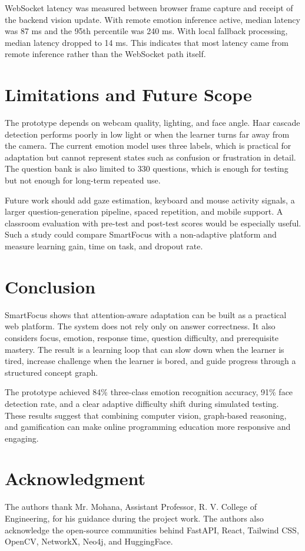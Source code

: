 \documentclass[conference]{IEEEtran}
\begin{document}
WebSocket latency was measured between browser frame capture and receipt of the backend vision update. With remote emotion inference active, median latency was 87 ms and the 95th percentile was 240 ms. With local fallback processing, median latency dropped to 14 ms. This indicates that most latency came from remote inference rather than the WebSocket path itself.

\FloatBarrier

\section{Limitations and Future Scope}

The prototype depends on webcam quality, lighting, and face angle. Haar cascade detection performs poorly in low light or when the learner turns far away from the camera. The current emotion model uses three labels, which is practical for adaptation but cannot represent states such as confusion or frustration in detail. The question bank is also limited to 330 questions, which is enough for testing but not enough for long-term repeated use.

Future work should add gaze estimation, keyboard and mouse activity signals, a larger question-generation pipeline, spaced repetition, and mobile support. A classroom evaluation with pre-test and post-test scores would be especially useful. Such a study could compare SmartFocus with a non-adaptive platform and measure learning gain, time on task, and dropout rate.

\section{Conclusion}

SmartFocus shows that attention-aware adaptation can be built as a practical web platform. The system does not rely only on answer correctness. It also considers focus, emotion, response time, question difficulty, and prerequisite mastery. The result is a learning loop that can slow down when the learner is tired, increase challenge when the learner is bored, and guide progress through a structured concept graph.

The prototype achieved 84\% three-class emotion recognition accuracy, 91\% face detection rate, and a clear adaptive difficulty shift during simulated testing. These results suggest that combining computer vision, graph-based reasoning, and gamification can make online programming education more responsive and engaging.

\section*{Acknowledgment}

The authors thank Mr. Mohana, Assistant Professor, R. V. College of Engineering, for his guidance during the project work. The authors also acknowledge the open-source communities behind FastAPI, React, Tailwind CSS, OpenCV, NetworkX, Neo4j, and HuggingFace.

\FloatBarrier
\appendices


\FloatBarrier
\balance


\end{document}
